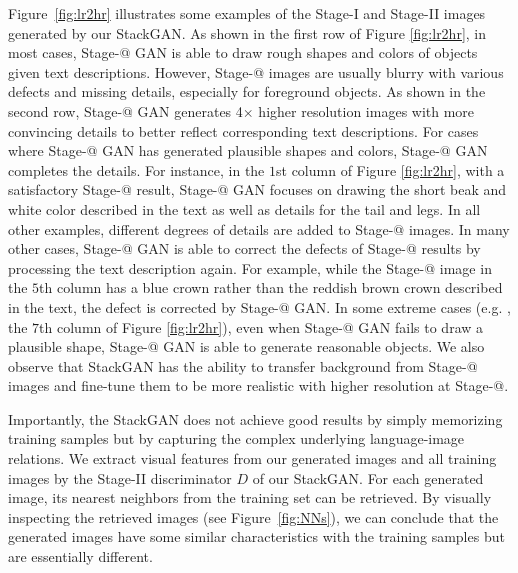 Figure~\ref{fig:lr2hr} illustrates some examples of the Stage-I and Stage-II images generated by our StackGAN. As shown in the first row of Figure \ref{fig:lr2hr}, in most cases, Stage-\expandafter\@slowromancap{}@ GAN is able to draw rough shapes and colors of objects given text descriptions. However, Stage-\expandafter\@slowromancap{}@ images are usually blurry with various defects and missing details, especially for foreground objects. As shown in the second row, Stage-\expandafter\@slowromancap{}@ GAN generates 4$\times$ higher resolution images with more convincing details to better reflect corresponding text descriptions. For cases where Stage-\expandafter\@slowromancap{}@ GAN has generated plausible shapes and colors, Stage-\expandafter\@slowromancap{}@ GAN completes the details. For instance, in the $1$st column of Figure \ref{fig:lr2hr}, with a satisfactory Stage-\expandafter\@slowromancap{}@ result, Stage-\expandafter\@slowromancap{}@ GAN focuses on drawing the short beak and white color described in the text as well as details for the tail and legs. In all other examples, different degrees of details are added to Stage-\expandafter\@slowromancap{}@ images. In many other cases, Stage-\expandafter\@slowromancap{}@ GAN is able to correct the defects of Stage-\expandafter\@slowromancap{}@ results by processing the text description again. For example, while the Stage-\expandafter\@slowromancap{}@ image in the $5$th column has a blue crown rather than the reddish brown crown described in the text, the defect is corrected by Stage-\expandafter\@slowromancap{}@ GAN. In some extreme cases (e.g. , the $7$th column of Figure \ref{fig:lr2hr}), even when Stage-\expandafter\@slowromancap{}@ GAN fails to draw a plausible shape, Stage-\expandafter\@slowromancap{}@ GAN is able to generate reasonable objects. We also observe that StackGAN has the ability to transfer background from Stage-\expandafter\@slowromancap{}@ images and fine-tune them to be more realistic with higher resolution at Stage-\expandafter\@slowromancap{}@.

Importantly, the StackGAN does not achieve good results by simply memorizing training samples but by capturing the complex underlying language-image relations. We extract visual features from our generated images and all training images by the Stage-II discriminator $D$ of our StackGAN. For each generated image, its nearest neighbors from the training set can be retrieved. By visually inspecting the retrieved images (see Figure~\ref{fig:NNs}), we can conclude that the generated images have some similar characteristics with the training samples but are essentially different. 

